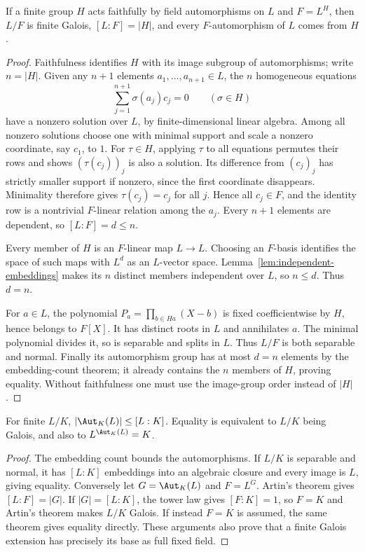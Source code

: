 \begin{theorem}
If a finite group $H$ acts faithfully by field automorphisms on $L$ and $F=L^H$, then $L/F$ is finite Galois, $[L:F]=|H|$, and every $F$-automorphism of $L$ comes from $H$.
\end{theorem}
\begin{proof}
Faithfulness identifies $H$ with its image subgroup of automorphisms; write $n=|H|$. Given any $n+1$ elements $a_1,\ldots,a_{n+1}\in L$, the $n$ homogeneous equations
\[\sum_{j=1}^{n+1}\sigma(a_j)c_j=0\qquad(\sigma\in H)
\]
have a nonzero solution over $L$, by finite-dimensional linear algebra. Among all nonzero solutions choose one with minimal support and scale a nonzero coordinate, say $c_1$, to $1$. For $\tau\in H$, applying $\tau$ to all equations permutes their rows and shows $(\tau(c_j))_j$ is also a solution. Its difference from $(c_j)_j$ has strictly smaller support if nonzero, since the first coordinate disappears. Minimality therefore gives $\tau(c_j)=c_j$ for all $j$. Hence all $c_j\in F$, and the identity row is a nontrivial $F$-linear relation among the $a_j$. Every $n+1$ elements are dependent, so $[L:F]=d\leq n$.

Every member of $H$ is an $F$-linear map $L\to L$. Choosing an $F$-basis identifies the space of such maps with $L^d$ as an $L$-vector space. Lemma~\ref{lem:independent-embeddings} makes its $n$ distinct members independent over $L$, so $n\leq d$. Thus $d=n$.

For $a\in L$, the polynomial $P_a=\prod_{b\in H a}(X-b)$ is fixed coefficientwise by $H$, hence belongs to $F[X]$. It has distinct roots in $L$ and annihilates $a$. The minimal polynomial divides it, so is separable and splits in $L$. Thus $L/F$ is both separable and normal. Finally its automorphism group has at most $d=n$ elements by the embedding-count theorem; it already contains the $n$ members of $H$, proving equality. Without faithfulness one must use the image-group order instead of $|H|$.
\end{proof}

\begin{theorem}
For finite $L/K$, $|\Aut_K(L)|\leq[L:K]$. Equality is equivalent to $L/K$ being Galois, and also to $L^{\Aut_K(L)}=K$.
\end{theorem}
\begin{proof}
The embedding count bounds the automorphisms. If $L/K$ is separable and normal, it has $[L:K]$ embeddings into an algebraic closure and every image is $L$, giving equality. Conversely let $G=\Aut_K(L)$ and $F=L^G$. Artin's theorem gives $[L:F]=|G|$. If $|G|=[L:K]$, the tower law gives $[F:K]=1$, so $F=K$ and Artin's theorem makes $L/K$ Galois. If instead $F=K$ is assumed, the same theorem gives equality directly. These arguments also prove that a finite Galois extension has precisely its base as full fixed field.
\end{proof}


